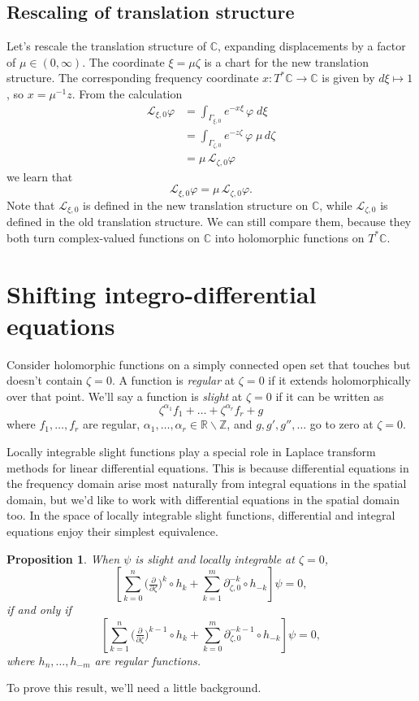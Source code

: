\documentclass{article}
\theoremstyle{plain}
\newtheorem{prop}{Proposition}
\newcommand{\maps}{\colon}
\newcommand{\Z}{\mathbb{Z}}
\newcommand{\R}{\mathbb{R}}
\newcommand{\C}{\mathbb{C}}
\newcommand{\laplace}{\mathcal{L}}
\newcommand{\fracderiv}[3]{\partial^{#1}_{#2, #3}}
\begin{document}
\subsection{Rescaling of translation structure}
Let's rescale the translation structure of $\C$, expanding displacements by a factor of $\mu \in (0, \infty)$. The coordinate $\xi = \mu\zeta$ is a chart for the new translation structure. The corresponding frequency coordinate $x \maps T^*\C \to \C$ is given by $d\xi \mapsto 1$, so $x = \mu^{-1} z$. From the calculation
\begin{align*}
\laplace_{\xi, 0} \varphi & = \int_{\Gamma_{\xi, 0}} e^{-x\xi}\,\varphi\;d\xi \\
& = \int_{\Gamma_{\zeta, 0}} e^{-z \zeta}\,\varphi\;\mu\,d\zeta \\
& = \mu\,\laplace_{\zeta, 0} \varphi
\end{align*}
we learn that
\[ \laplace_{\xi, 0} \varphi = \mu\,\laplace_{\zeta, 0} \varphi. \]
Note that $\laplace_{\xi, 0}$ is defined in the new translation structure on $\C$, while $\laplace_{\zeta, 0}$ is defined in the old translation structure. We can still compare them, because they both turn complex-valued functions on $\C$ into holomorphic functions on $T^*\C$.
\section{Shifting integro-differential equations}\label{shifting}
Consider holomorphic functions on a simply connected open set that touches but doesn't contain $\zeta = 0$. A function is {\em regular} at $\zeta = 0$ if it extends holomorphically over that point. We'll say a function is {\em slight} at $\zeta = 0$ if it can be written as
\begin{equation}\label{eqn:slight-defn}
\zeta^{\alpha_1} f_1 + \ldots + \zeta^{\alpha_r} f_r + g
\end{equation}
where $f_1, \ldots, f_r$ are regular, $\alpha_1, \ldots, \alpha_r \in \R \smallsetminus \Z$, and $g, g', g'', \ldots$ go to zero at $\zeta = 0$.

Locally integrable slight functions play a special role in Laplace transform methods for linear differential equations. This is because differential equations in the frequency domain arise most naturally from integral equations in the spatial domain, but we'd like to work with differential equations in the spatial domain too. In the space of locally integrable slight functions, differential and integral equations enjoy their simplest equivalence.
\begin{prop}\label{prop:shifting}
When $\psi$ is slight and locally integrable at $\zeta = 0$,
\[ \left[ \sum_{k = 0}^n \big(\tfrac{\partial}{\partial \zeta}\big)^k \circ h_k + \sum_{k = 1}^m \fracderiv{-k}{\zeta}{0} \circ h_{-k} \right] \psi = 0, \]
if and only if
\[ \left[ \sum_{k = 1}^n \big(\tfrac{\partial}{\partial \zeta}\big)^{k-1} \circ h_k + \sum_{k = 0}^m \fracderiv{-k-1}{\zeta}{0} \circ h_{-k} \right] \psi = 0, \]
where $h_n, \ldots, h_{-m}$ are regular functions.
\end{prop}
To prove this result, we'll need a little background.
\end{document}
